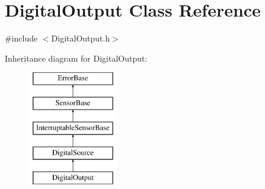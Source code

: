 \hypertarget{classDigitalOutput}{\section{\-Digital\-Output \-Class \-Reference}
\label{classDigitalOutput}
}


{\ttfamily \#include $<$\-Digital\-Output.\-h$>$}

\-Inheritance diagram for \-Digital\-Output\-:\begin{figure}[H]
\begin{center}
\leavevmode
\includegraphics[height=5.000000cm]{classDigitalOutput}
\end{center}
\end{figure}
